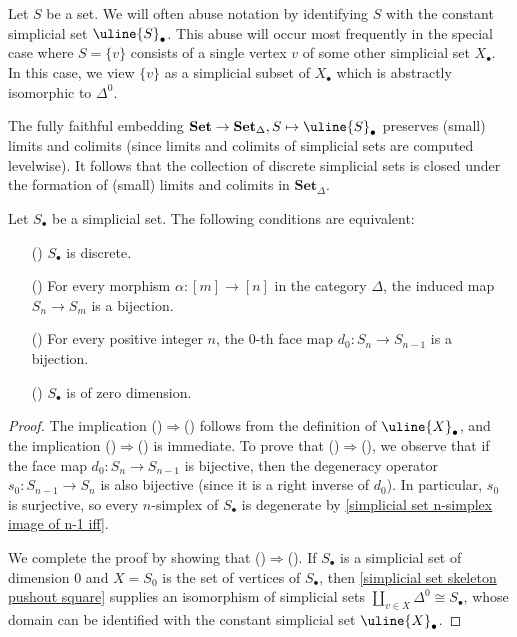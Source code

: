 Let $S$ be a set. We will often abuse notation by identifying $S$ with the constant simplicial set $\uline{S}_\bullet$. This abuse will occur most frequently in the special case where $S=\{v\}$ consists of a single vertex $v$ of some other simplicial set $X_\bullet$. In this case, we view $\{v\}$ as a simplicial subset of $X_\bullet$ which is abstractly isomorphic to $\Delta^0$.
\begin{remark}
The fully faithful embedding $\mathbf{Set}\to\mathbf{Set}_\Delta,S\mapsto\uline{S}_\bullet$ preserves (small) limits and colimits (since limits and colimits of simplicial sets are computed levelwise). It follows that the collection of discrete simplicial sets is closed under the formation of (small) limits and colimits in $\mathbf{Set}_\Delta$.
\end{remark}
\begin{proposition}\label{simplicial set discrete iff}
Let $S_\bullet$ be a simplicial set. The following conditions are equivalent:
\begin{itemize}
\item[(\rmnum{1})] $S_\bullet$ is discrete.
\item[(\rmnum{2})] For every morphism $\alpha:[m]\to[n]$ in the category $\Delta$, the induced map $S_n\to S_m$ is a bijection.
\item[(\rmnum{3})] For every positive integer $n$, the $0$-th face map $d_0:S_n\to S_{n-1}$ is a bijection.
\item[(\rmnum{4})] $S_\bullet$ is of zero dimension.   
\end{itemize}
\end{proposition}
\begin{proof}
The implication ()$\Rightarrow$() follows from the definition of $\uline{X}_\bullet$, and the implication ()$\Rightarrow$() is immediate. To prove that ()$\Rightarrow$(), we observe that if the face map $d_0:S_n\to S_{n-1}$ is bijective, then the degeneracy operator $s_0:S_{n-1}\to S_n$ is also bijective (since it is a right inverse of $d_0$). In particular, $s_0$ is surjective, so every $n$-simplex of $S_\bullet$ is degenerate by \cref{simplicial set n-simplex image of n-1 iff}.\par
We complete the proof by showing that ()$\Rightarrow$(). If $S_\bullet$ is a simplicial set of dimension $0$ and $X=S_0$ is the set of vertices of $S_\bullet$, then \cref{simplicial set skeleton pushout square} supplies an isomorphism of simplicial sets $\amalg_{v\in X}\Delta^0\cong S_\bullet$, whose domain can be identified with the constant simplicial set $\uline{X}_\bullet$.
\end{proof}

